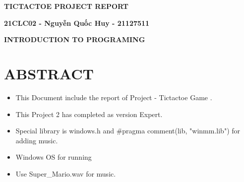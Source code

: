 \documentclass[12pt,a4paper]{article}
\begin{document}
\thispagestyle{empty}
\begin{LARGE}
    \begin{center}{\underline{\color{red}{\bf NATIONAL UNIVERSITY OF HO CHI MINH CITY}}}
    \end{center}
\end{LARGE}
\vspace*{1cm}
\begin{center}{\Huge \color{green}\textbf{TICTACTOE PROJECT REPORT}}
\end{center}
\vspace*{15cm}
\begin{center}{\Huge \color{cyan}\textbf{21CLC02 - Nguyễn Quốc Huy - 21127511}}
\end{center}
\vspace*{1cm}
\begin{center}
    {\Huge \color{cyan}\textbf{{INTRODUCTION TO PROGRAMING}}}
\end{center}
\newpage
\let\cleardoublepage\clearpage
\section{\textbf{\color{red}ABSTRACT}}
\begin{itemize}
    \item This Document include the report of Project - Tictactoe Game .
    \item This Project 2 has completed as version Expert.
    \item Special library is windows.h and \#pragma comment(lib, "winmm.lib") for adding music.
    \item Windows OS for running
    \item Use Super\_Mario.wav for music.
\end{itemize}
\tableofcontents

\newpage
\end{document}

